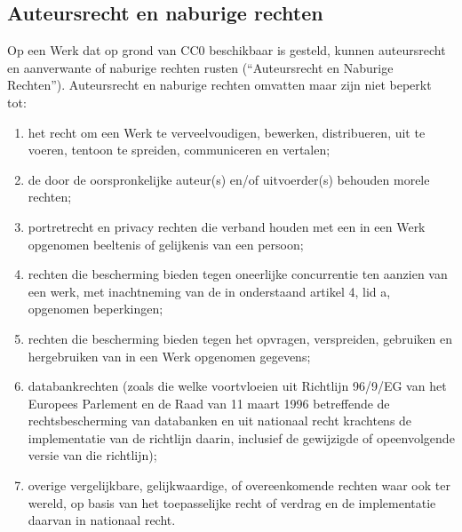 \documentclass[10pt, a4paper]{article}
\begin{document}
\subsection{Auteursrecht en naburige rechten}
Op een Werk dat op grond van CC0 beschikbaar is gesteld, kunnen auteursrecht en aanverwante of naburige rechten rusten (``Auteursrecht en Naburige Rechten''). Auteursrecht en naburige rechten omvatten maar zijn niet beperkt tot:
\begin{enumerate}
\item het recht om een Werk te verveelvoudigen, bewerken, distribueren, uit te voeren, tentoon te spreiden, communiceren en vertalen;
\item de door de oorspronkelijke auteur(s) en/of uitvoerder(s) behouden morele rechten;
\item portretrecht en privacy rechten die verband houden met een in een Werk opgenomen beeltenis of gelijkenis van een persoon;
\item rechten die bescherming bieden tegen oneerlijke concurrentie ten aanzien van een werk, met inachtneming van de in onderstaand artikel 4, lid a, opgenomen beperkingen;
\item rechten die bescherming bieden tegen het opvragen, verspreiden, gebruiken en hergebruiken van in een Werk opgenomen gegevens;
\item databankrechten (zoals die welke voortvloeien uit Richtlijn 96/9/EG van het Europees Parlement en de Raad van 11 maart 1996 betreffende de rechtsbescherming van databanken en uit nationaal recht krachtens de implementatie van de richtlijn daarin, inclusief de gewijzigde of opeenvolgende versie van die richtlijn); 
\item overige vergelijkbare, gelijkwaardige, of overeenkomende rechten waar ook ter wereld, op basis van het toepasselijke recht of verdrag en de implementatie daarvan in nationaal recht.
\end{enumerate}
\end{document}
